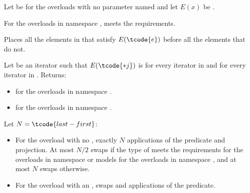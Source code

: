 \begin{itemdescr}
\pnum
Let  be 
for the overloads with no parameter named 
and let $E(x)$ be .

\pnum
\expects
For the overloads in namespace ,
 meets
the  requirements.

\pnum
\effects
Places all the elements  in 
that satisfy $E(\tcode{e})$ before all the elements that do not.

\pnum
\returns
Let  be an iterator such that $E(\tcode{*j})$ is
 for every iterator  in  and
 for every iterator  in .
Returns:
\begin{itemize}
\item {} for the overloads in namespace .
\item {} for the overloads in namespace .
\end{itemize}


\pnum
\complexity
Let $N = \tcode{last - first}$:
\begin{itemize}
\item
  For the overload with no ,
  exactly $N$ applications of the predicate and projection.
  At most $N / 2$ swaps if the type of  meets
  the  requirements
  for the overloads in namespace  or
  models 
  for the overloads in namespace ,
  and at most $N$ swaps otherwise.
\item
  For the overload with an ,
   swaps and  applications of the predicate.
\end{itemize}
\end{itemdescr}


